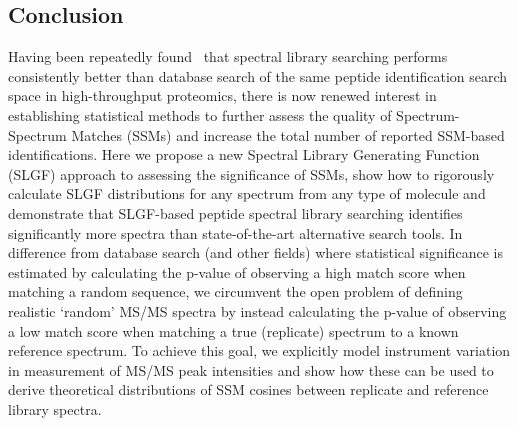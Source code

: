 \documentclass[endnotes,11pt]{article}
\begin{document}



\subsection*{Conclusion}

Having been repeatedly found~\cite{lam07,yen11,lam10methods,dasari12} that spectral library searching performs consistently better than database search of the same peptide identification search space in high-throughput proteomics, there is now renewed interest in establishing statistical methods to further assess the quality of Spectrum-Spectrum Matches (SSMs) and increase the total number of reported SSM-based identifications. Here we propose a new Spectral Library Generating Function (SLGF) approach to assessing the significance of SSMs, show how to rigorously calculate SLGF distributions for any spectrum from any type of molecule and demonstrate that SLGF-based peptide spectral library searching identifies significantly more spectra than state-of-the-art alternative search tools. In difference from database search (and other fields) where statistical significance is estimated by calculating the p-value of observing a high match score when matching a random sequence, we circumvent the open problem of defining realistic `random' MS/MS spectra by instead calculating the p-value of observing a low match score when matching a true (replicate) spectrum to a known reference spectrum. To achieve this goal, we explicitly model instrument variation in measurement of MS/MS peak intensities and show how these can be used to derive theoretical distributions of SSM cosines between replicate and reference library spectra.
\end{document}
